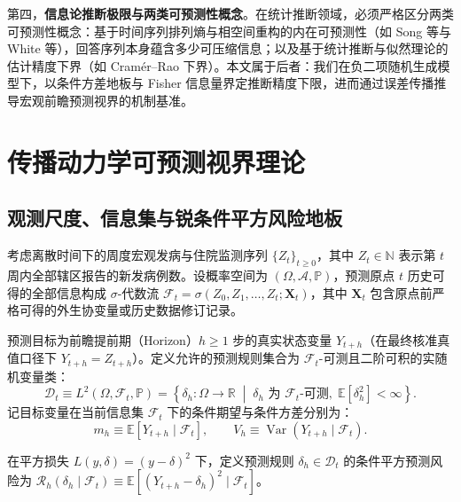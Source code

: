 \documentclass[11pt,a4paper]{article}
\theoremstyle{plain}
\theoremstyle{definition}
\begin{document}
第四，\textbf{信息论推断极限与两类可预测性概念}。在统计推断领域，必须严格区分两类可预测性概念：基于时间序列排列熵与相空间重构的内在可预测性（如 Song 等\citep{song2010limits}与 White 等\citep{white2026forecastability}），回答序列本身蕴含多少可压缩信息；以及基于统计推断与似然理论的估计精度下界（如 Cramér--Rao 下界）\citep{parag2022fundamental}。本文属于后者：我们在负二项随机生成模型下，以条件方差地板与 Fisher 信息量界定推断精度下限，进而通过误差传播推导宏观前瞻预测视界的机制基准。

\section{传播动力学可预测视界理论}\label{sec:theory}

\subsection{观测尺度、信息集与锐条件平方风险地板}\label{sec:risk_floor}

考虑离散时间下的周度宏观发病与住院监测序列 $\{Z_t\}_{t \ge 0}$，其中 $Z_t \in \mathbb{N}$ 表示第 $t$ 周内全部辖区报告的新发病例数。设概率空间为 $(\Omega, \mathcal{A}, \mathbb{P})$，预测原点 $t$ 历史可得的全部信息构成 $\sigma$-代数流 $\mathcal{F}_t = \sigma(Z_0, Z_1, \dots, Z_t; \mathbf{X}_t)$，其中 $\mathbf{X}_t$ 包含原点前严格可得的外生协变量或历史数据修订记录。

预测目标为前瞻提前期（Horizon）$h \ge 1$ 步的真实状态变量 $Y_{t+h}$（在最终核准真值口径下 $Y_{t+h} = Z_{t+h}$）。定义允许的预测规则集合为 $\mathcal{F}_t$-可测且二阶可积的实随机变量类：
\begin{equation}
\mathcal{D}_t \equiv L^2(\Omega, \mathcal{F}_t, \mathbb{P}) = \left\{ \delta_h : \Omega \to \mathbb{R} \;\middle|\; \delta_h \text{ 为 } \mathcal{F}_t\text{-可测}, \; \mathbb{E}[\delta_h^2] < \infty \right\}.
\end{equation}
记目标变量在当前信息集 $\mathcal{F}_t$ 下的条件期望与条件方差分别为：
\begin{equation}
m_h \equiv \mathbb{E}[Y_{t+h} \mid \mathcal{F}_t], \qquad V_h \equiv \operatorname{Var}(Y_{t+h} \mid \mathcal{F}_t).
\end{equation}

在平方损失 $L(y, \delta) = (y - \delta)^2$ 下，定义预测规则 $\delta_h \in \mathcal{D}_t$ 的条件平方预测风险为 $\mathcal{R}_h(\delta_h \mid \mathcal{F}_t) \equiv \mathbb{E}[(Y_{t+h} - \delta_h)^2 \mid \mathcal{F}_t]$。
\end{document}
